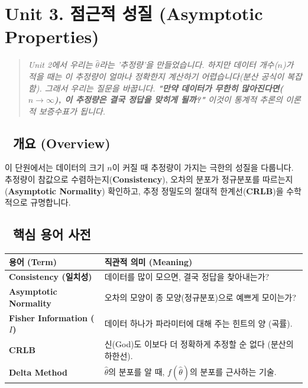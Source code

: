 \documentclass[11pt,a4paper]{book}
\theoremstyle{definition}
\begin{document}
\section{Unit 3. 점근적 성질 (Asymptotic Properties)}

\begin{quote}
\textit{Unit 2에서 우리는 $\hat{\theta}$라는 '추정량'을 만들었습니다. 하지만 데이터 개수($n$)가 적을 때는 이 추정량이 얼마나 정확한지 계산하기 어렵습니다(분산 공식이 복잡함). 그래서 우리는 질문을 바꿉니다. \textbf{"만약 데이터가 무한히 많아진다면($n \to \infty$), 이 추정량은 결국 정답을 맞히게 될까?"} 이것이 통계적 추론의 이론적 보증수표가 됩니다.}
\end{quote}

\subsection*{📌 개요 (Overview)}
이 단원에서는 데이터의 크기 $n$이 커질 때 추정량이 가지는 극한의 성질을 다룹니다. 추정량이 참값으로 수렴하는지(\textbf{Consistency}), 오차의 분포가 정규분포를 따르는지(\textbf{Asymptotic Normality}) 확인하고, 추정 정밀도의 절대적 한계선(\textbf{CRLB})을 수학적으로 규명합니다.

\subsection*{📝 핵심 용어 사전}
\begin{table}[h]
\centering
\begin{tabularx}{\textwidth}{|p{}|X|}
\hline
\textbf{용어 (Term)} & \textbf{직관적 의미 (Meaning)} \\
\hline
\textbf{Consistency (일치성)} & 데이터를 많이 모으면, 결국 정답을 찾아내는가? \\
\hline
\textbf{Asymptotic Normality} & 오차의 모양이 종 모양(정규분포)으로 예쁘게 모이는가? \\
\hline
\textbf{Fisher Information ($I$)} & 데이터 하나가 파라미터에 대해 주는 힌트의 양 (곡률). \\
\hline
\textbf{CRLB} & 신(God)도 이보다 더 정확하게 추정할 순 없다 (분산의 하한선). \\
\hline
\textbf{Delta Method} & $\hat{\theta}$의 분포를 알 때, $f(\hat{\theta})$의 분포를 근사하는 기술. \\
\hline
\end{tabularx}
\end{table}
\end{document}

